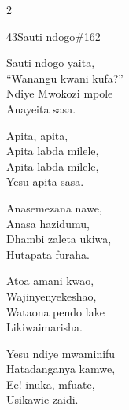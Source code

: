 \documentclass{article}
\begin{document}
\begin{multicols}{2}
\begin{hymn}{43}{Sauti ndogo}{\#162}
\begin{stanza}
Sauti ndogo yaita,\\
``Wanangu kwani kufa?''\\
Ndiye Mwokozi mpole\\
Anayeita sasa.
\end{stanza}
\begin{chorus}
Apita, apita,\\
Apita labda milele,\\
Apita labda milele,\\
Yesu apita sasa.
\end{chorus}
\begin{stanza}
Anasemezana nawe,\\
Anasa hazidumu,\\
Dhambi zaleta ukiwa,\\
Hutapata furaha.
\end{stanza}
\begin{stanza}
Atoa amani kwao,\\
Wajinyenyekeshao,\\
Wataona pendo lake\\
Likiwaimarisha.
\end{stanza}
\begin{stanza}
Yesu ndiye mwaminifu\\
Hatadanganya kamwe,\\
Ee! inuka, mfuate,\\
Usikawie zaidi.
\end{stanza}
\end{hymn}


\end{multicols}
\end{document}
